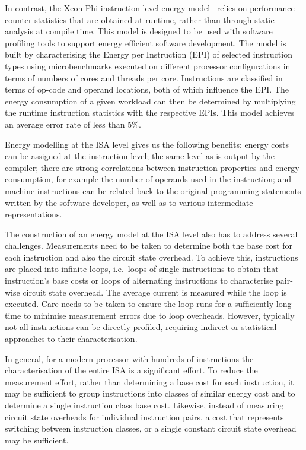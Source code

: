 In contrast, the Xeon Phi instruction-level energy model~\cite{phimodel} relies
on performance counter statistics that are obtained at runtime, rather than
through static analysis at compile time. This model is designed to be used with
software profiling tools to support energy efficient software development. The
model is built by characterising the Energy per Instruction (EPI) of selected
instruction types using microbenchmarks executed on different processor
configurations in terms of numbers of cores and threads per core. Instructions
are classified in terms of op-code and operand locations, both of which
influence the EPI.
%
The energy consumption of a given workload can then be determined by
multiplying the runtime instruction statistics with the respective EPIs.
%
This model achieves an average error rate of less than 5\%.


Energy modelling at the ISA level gives us the following benefits: energy
costs can be assigned at the instruction level; the same level as is output by
the compiler; there are strong correlations between instruction properties and
energy consumption, for example the number of operands used in the instruction;
and machine instructions can be related back to the original programming
statements written by the software developer, as well as to various
intermediate representations. 

The construction of an energy model at the ISA level also has to address several
challenges.
%
Measurements need to be taken to determine both the base cost for each
instruction and also the circuit state overhead. To achieve this, instructions
are placed into infinite loops, i.e.\ loops of single instructions to obtain
that instruction's base costs or loops of alternating instructions to
characterise pair-wise circuit state overhead. The average current is measured
while the loop is executed. Care needs to be taken to ensure the loop runs for
a sufficiently long time to minimise measurement errors due to loop overheads.
%
However, typically not all instructions can be directly profiled, requiring
indirect or statistical approaches to their characterisation.

In general, for a modern processor with hundreds of instructions the
characterisation of the entire ISA is a significant effort.
%
To reduce the measurement effort, rather than determining a base cost for each
instruction, it may be sufficient to group instructions into classes of similar
energy cost and to determine a single instruction class base cost. Likewise,
instead of measuring circuit state overheads for individual instruction pairs,
a cost that represents switching between instruction classes, or a single
constant circuit state overhead may be sufficient.

